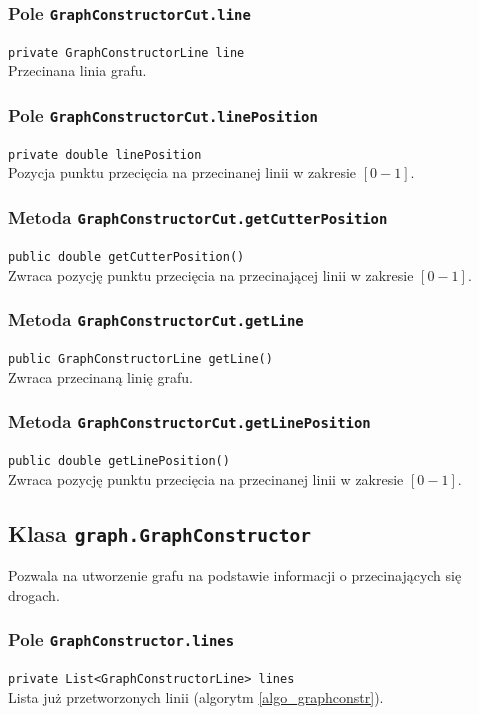 \documentclass{article}
\begin{document}
\subsubsection{Pole \texttt{GraphConstructorCut.line}}
\texttt{private GraphConstructorLine line} \\
Przecinana linia grafu.

\subsubsection{Pole \texttt{GraphConstructorCut.linePosition}}
\texttt{private double linePosition} \\
Pozycja punktu przecięcia na przecinanej linii w zakresie \([0-1]\).

\subsubsection{Metoda \texttt{GraphConstructorCut.getCutterPosition}}
\texttt{public double getCutterPosition()} \\
Zwraca pozycję punktu przecięcia na przecinającej linii w zakresie \([0-1]\).

\subsubsection{Metoda \texttt{GraphConstructorCut.getLine}}
\texttt{public GraphConstructorLine getLine()} \\
Zwraca przecinaną linię grafu.

\subsubsection{Metoda \texttt{GraphConstructorCut.getLinePosition}}
\texttt{public double getLinePosition()} \\
Zwraca pozycję punktu przecięcia na przecinanej linii w zakresie \([0-1]\).

\subsection{Klasa \texttt{graph.GraphConstructor}}
Pozwala na utworzenie grafu na podstawie informacji o przecinających się drogach.

\subsubsection{Pole \texttt{GraphConstructor.lines}}
\texttt{private List<GraphConstructorLine> lines} \\
Lista już przetworzonych linii (algorytm \ref{algo_graphconstr}).
\end{document}
